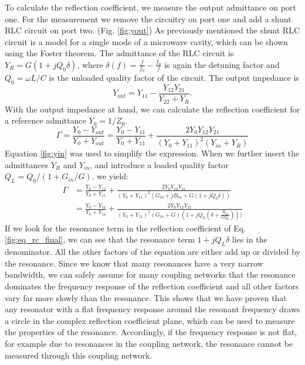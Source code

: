 To calculate the reflection coefficient, we measure the output admittance on port one. For the measurement we remove the circuitry on port one and add a shunt RLC circuit on port two. (Fig. \ref{fig:yout}) As previously mentioned the shunt RLC circuit is a model for a single mode of a microwave cavity, which can be shown using the Foster theorem. The admittance of the RLC circuit is $Y_R=G(1+jQ_0\delta)$, where $\delta(f)=\frac{f}{f_0}-\frac{f_0}{f}$ is again the detuning factor and $Q_0=\omega L/C$ is the unloaded quality factor of the circuit. The output impedance is
\begin{equation}
Y_{out}=Y_{11}-\frac{Y_{12}Y_{21}}{Y_{22}+Y_{R}}\text{.}
\end{equation}
With the output impedance at hand, we can calculate the reflection coefficient for a reference admittance $Y_0=1/Z_0$.
\begin{equation}
\Gamma=\frac{Y_0-Y_{out}}{Y_0+Y_{out}}=\frac{Y_0-Y_{11}}{Y_0+Y_{11}}+\frac{2Y_0Y_{12}Y_{21}}{(Y_{0}+Y_{11})^2(Y_{in}+Y_R)}
\end{equation}
Equation \eqref{fig:yin} was used to simplify the expression. When we further insert the admittances $Y_R$ and $Y_{in}$, and introduce a loaded quality factor $Q_L=Q_0/(1+G_{in}/G)$, we yield:
\begin{align}
\Gamma&=\frac{Y_0-Y_{11}}{Y_0+Y_{11}}+\frac{2Y_0Y_{12}Y_{21}}{(Y_{0}+Y_{11})^2(G_{in}+jB_{in}+G(1+jQ_0\delta))}\\
&=\frac{Y_0-Y_{11}}{Y_0+Y_{11}}+\frac{2Y_0Y_{12}Y_{21}}{(Y_{0}+Y_{11})^2(G_{in}+G)(1+jQ_L(\delta+\frac{B_{in}}{GQ_0})))} \label{fig:eq_rc_final}
\end{align}
If we look for the resonance term in the reflection coefficient of Eq. \eqref{fig:eq_rc_final}, we can see that the resonance term $1+jQ_L\delta$ lies in the denominator. All the other factors of the equation are either add up or divided by the resonance. Since we know that many resonances have a very narrow bandwidth, we can safely assume for many coupling networks that the resonance dominates the frequency response of the reflection coefficient and all other factors vary far more slowly than the resonance. This shows that we have proven that any resonator with a flat frequency response around the resonant frequency draws a circle in the complex reflection coefficient plane, which can be used to measure the properties of the resonance. Accordingly, if the frequency response is not flat, for example due to resonances in the coupling network, the resonance cannot be measured through this coupling network.


